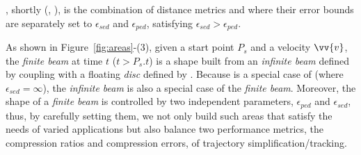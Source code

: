 , shortly \bed (\sed, \ped), is the combination of distance metrics \sed and \ped where their error bounds are separately set to $\epsilon_{sed}$ and $\epsilon_{ped}$, satisfying $\epsilon_{sed} > \epsilon_{ped}$. 


%
%

As shown in {Figure~\ref{fig:areas}-(3)}, given a start point $P_s$ and a velocity $\vv{v}$, the \emph{finite beam} at time $t$ ($t>P_s.t$) is a shape built from an \emph{infinite beam} defined by \ped coupling with a floating \emph{disc} defined by \sed.
Because \ped is a special case of \bed (where $\epsilon_{sed}=\infty$), the \emph{infinite beam} is also a special case of the \emph{finite beam}. Moreover, the shape of a \emph{finite beam} is controlled by two independent parameters, $\epsilon_{ped}$ and $\epsilon_{sed}$, thus, by carefully setting them, we not only build such areas that satisfy the needs of varied applications but also balance two performance metrics, the compression ratios and compression errors, of trajectory simplification/tracking. 



